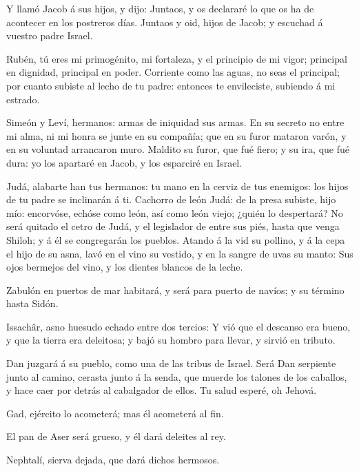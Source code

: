  Y llamó Jacob á sus hijos, y dijo: Juntaos, y os declararé
lo que os ha de acontecer en los postreros días.  Juntaos y
oid, hijos de Jacob; y escuchad á vuestro padre Israel.

 Rubén, tú eres mi primogénito, mi fortaleza, y el principio
de mi vigor; principal en dignidad, principal en poder. 
Corriente como las aguas, no seas el principal; por cuanto subiste al
lecho de tu padre: entonces te envileciste, subiendo á mi estrado.

 Simeón y Leví, hermanos: armas de iniquidad sus armas.
 En su secreto no entre mi alma, ni mi honra se junte en su
compañía; que en su furor mataron varón, y en su voluntad arrancaron
muro.  Maldito su furor, que fué fiero; y su ira, que fué
dura: yo los apartaré en Jacob, y los esparciré en Israel.

 Judá, alabarte han tus hermanos: tu mano en la cerviz de
tus enemigos: los hijos de tu padre se inclinarán á ti. 
Cachorro de león Judá: de la presa subiste, hijo mío: encorvóse, echóse
como león, así como león viejo; ¿quién lo despertará?  No
será quitado el cetro de Judá, y el legislador de entre sus piés, hasta
que venga Shiloh; y á él se congregarán los pueblos. 
Atando á la vid su pollino, y á la cepa el hijo de su asna, lavó en el
vino su vestido, y en la sangre de uvas su manto:  Sus ojos
bermejos del vino, y los dientes blancos de la leche.

 Zabulón en puertos de mar habitará, y será para puerto de
navíos; y su término hasta Sidón.

 Issachâr, asno huesudo echado entre dos tercios:
 Y vió que el descanso era bueno, y que la tierra era
deleitosa; y bajó su hombro para llevar, y sirvió en tributo.

 Dan juzgará á su pueblo, como una de las tribus de Israel.
 Será Dan serpiente junto al camino, cerasta junto á la
senda, que muerde los talones de los caballos, y hace caer por detrás al
cabalgador de ellos.  Tu salud esperé, oh Jehová.

 Gad, ejército lo acometerá; mas él acometerá al fin.

 El pan de Aser será grueso, y él dará deleites al rey.

 Nephtalí, sierva dejada, que dará dichos hermosos.


